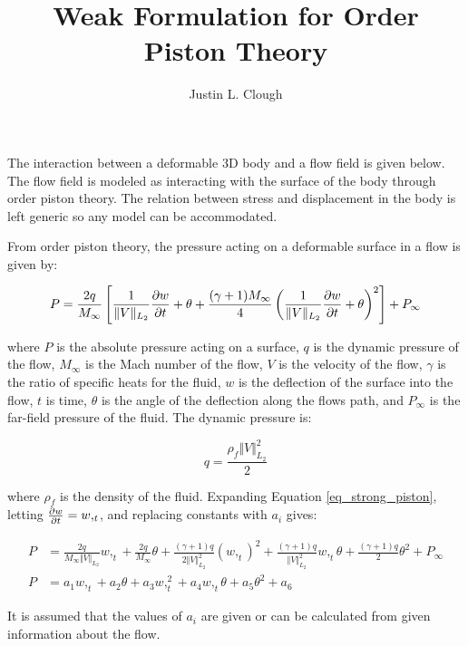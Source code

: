 \documentclass[a4paper, 12pt]{article}
\author{Justin L. Clough}
\title{Weak Formulation for \nth{2} Order Piston Theory}
\begin{document}
\maketitle

The interaction between a deformable 3D body and
a flow field is given below.
The flow field is modeled as interacting with the surface 
of the body through  order piston theory.
The relation between stress and displacement in the body
is left generic so any model can be accommodated.


From  order piston theory, the pressure acting
on a deformable surface in a flow is 
given by:

\begin{equation}
P = \frac{2q}{M_\infty} 
  \left[
    \frac{1}{\Vert V\Vert_{L_2}} \pdv{w}{t} + \theta 
    + \frac{ (\gamma+1) M_\infty}{4} 
      \left(
        \frac{1}{\Vert V\Vert_{L_2}} \pdv{w}{t} + \theta
      \right)^2
  \right]
  + P_\infty
  \label{eq_strong_piston}
\end{equation}

\noindent
where 
$P$ is the absolute pressure acting on a surface,
$q$ is the dynamic pressure of the flow, 
$M_\infty$ is the Mach number of the flow,
$V$ is the velocity of the flow,
$\gamma$ is the ratio of specific heats for the fluid,
$w$ is the deflection of the surface into the flow,
$t$ is time, 
$\theta$ is the angle of the deflection along the flows path,
and
$P_\infty$ is the far-field pressure of the fluid.
The dynamic pressure is:

\begin{equation}
q = \frac{ \rho_f \Vert V\Vert_{L_2}^2}{2}
\end{equation}

\noindent
where 
$\rho_f$ is the density of the fluid.
Expanding Equation \eqref{eq_strong_piston},
letting $\pdv{w}{t}=w,_t$,
and replacing constants with $a_i$ gives:

\begin{align}
P& 
  = \frac{2q}{M_\infty \Vert V\Vert_{L_2}} w,_t
  + \frac{2q}{M_\infty} \theta
  + \frac{(\gamma +1)q}{2\Vert V\Vert_{L_2}^2} (w,_t)^2
  + \frac{(\gamma+1)q}{\Vert V\Vert^2_{L_2}} w,_t \theta 
  + \frac{(\gamma+1)q}{2} \theta^2
  + P_\infty \\
P& 
  = a_1 w,_t
  + a_2 \theta
  + a_3 w,_t^2
  + a_4 w,_t \theta 
  + a_5 \theta^2
  + a_6
\end{align}

\noindent
It is assumed that the values of $a_i$ are given 
or can be calculated from given information about the flow.
\end{document}
